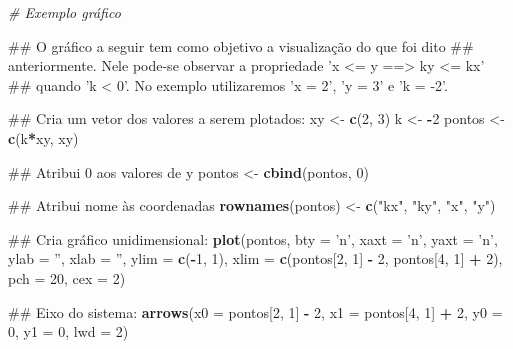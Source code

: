 \documentclass[]{book}
\newenvironment{Shaded}{\begin{snugshade}}{\end{snugshade}}
\newcommand{\KeywordTok}[1]{\textcolor[rgb]{0.13,0.29,0.53}{\textbf{#1}}}
\newcommand{\DataTypeTok}[1]{\textcolor[rgb]{0.13,0.29,0.53}{#1}}
\newcommand{\DecValTok}[1]{\textcolor[rgb]{0.00,0.00,0.81}{#1}}
\newcommand{\StringTok}[1]{\textcolor[rgb]{0.31,0.60,0.02}{#1}}
\newcommand{\CommentTok}[1]{\textcolor[rgb]{0.56,0.35,0.01}{\textit{#1}}}
\newcommand{\OperatorTok}[1]{\textcolor[rgb]{0.81,0.36,0.00}{\textbf{#1}}}
\newcommand{\NormalTok}[1]{#1}
\begin{document}
\begin{Shaded}
\begin{Highlighting}[]
\CommentTok{# Exemplo gráfico}

\NormalTok{##  O gráfico a seguir tem como objetivo a visualização do que foi dito}
\NormalTok{## anteriormente. Nele pode-se observar a propriedade 'x <= y  ==>  ky <= kx'}
\NormalTok{## quando 'k < 0'. No exemplo utilizaremos 'x = 2', 'y = 3' e 'k = -2'.}

\NormalTok{##  Cria um vetor dos valores a serem plotados:}
\NormalTok{xy <-}\StringTok{ }\KeywordTok{c}\NormalTok{(}\DecValTok{2}\NormalTok{, }\DecValTok{3}\NormalTok{)}
\NormalTok{k <-}\StringTok{ }\OperatorTok{-}\DecValTok{2}
\NormalTok{pontos <-}\StringTok{ }\KeywordTok{c}\NormalTok{(k}\OperatorTok{*}\NormalTok{xy, xy)}

\NormalTok{##  Atribui 0 aos valores de y}
\NormalTok{pontos <-}\StringTok{ }\KeywordTok{cbind}\NormalTok{(pontos, }\DecValTok{0}\NormalTok{)}

\NormalTok{##  Atribui nome às coordenadas}
\KeywordTok{rownames}\NormalTok{(pontos) <-}\StringTok{ }\KeywordTok{c}\NormalTok{(}\StringTok{"kx"}\NormalTok{, }\StringTok{"ky"}\NormalTok{, }\StringTok{"x"}\NormalTok{, }\StringTok{"y"}\NormalTok{)}

\NormalTok{##  Cria gráfico unidimensional:}
\KeywordTok{plot}\NormalTok{(pontos, }\DataTypeTok{bty =} \StringTok{'n'}\NormalTok{, }\DataTypeTok{xaxt =} \StringTok{'n'}\NormalTok{, }\DataTypeTok{yaxt =} \StringTok{'n'}\NormalTok{, }\DataTypeTok{ylab =} \StringTok{''}\NormalTok{, }\DataTypeTok{xlab =} \StringTok{''}\NormalTok{,}
     \DataTypeTok{ylim =} \KeywordTok{c}\NormalTok{(}\OperatorTok{-}\DecValTok{1}\NormalTok{, }\DecValTok{1}\NormalTok{),}
     \DataTypeTok{xlim =} \KeywordTok{c}\NormalTok{(pontos[}\DecValTok{2}\NormalTok{, }\DecValTok{1}\NormalTok{] }\OperatorTok{-}\StringTok{ }\DecValTok{2}\NormalTok{, pontos[}\DecValTok{4}\NormalTok{, }\DecValTok{1}\NormalTok{] }\OperatorTok{+}\StringTok{ }\DecValTok{2}\NormalTok{), }\DataTypeTok{pch =} \DecValTok{20}\NormalTok{, }\DataTypeTok{cex =} \DecValTok{2}\NormalTok{)}

\NormalTok{##  Eixo do sistema:}
\KeywordTok{arrows}\NormalTok{(}\DataTypeTok{x0 =}\NormalTok{ pontos[}\DecValTok{2}\NormalTok{, }\DecValTok{1}\NormalTok{] }\OperatorTok{-}\StringTok{ }\DecValTok{2}\NormalTok{, }\DataTypeTok{x1 =}\NormalTok{ pontos[}\DecValTok{4}\NormalTok{, }\DecValTok{1}\NormalTok{] }\OperatorTok{+}\StringTok{ }\DecValTok{2}\NormalTok{,}
       \DataTypeTok{y0 =} \DecValTok{0}\NormalTok{, }\DataTypeTok{y1 =} \DecValTok{0}\NormalTok{, }\DataTypeTok{lwd =} \DecValTok{2}\NormalTok{)}


\end{Highlighting}
\end{Shaded}
\end{document}
